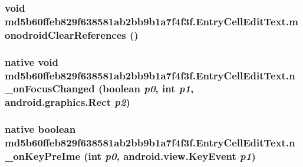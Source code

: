 \hypertarget{classmd5b60ffeb829f638581ab2bb9b1a7f4f3f_1_1_entry_cell_edit_text_3a4945fa7f86ca938cd71b78f446aa32}{
\subsubsection[{monodroidClearReferences}]{\setlength{\rightskip}{0pt plus 5cm}void md5b60ffeb829f638581ab2bb9b1a7f4f3f.EntryCellEditText.monodroidClearReferences ()}}
\label{classmd5b60ffeb829f638581ab2bb9b1a7f4f3f_1_1_entry_cell_edit_text_3a4945fa7f86ca938cd71b78f446aa32}


\hypertarget{classmd5b60ffeb829f638581ab2bb9b1a7f4f3f_1_1_entry_cell_edit_text_448e938035b755ec2d8f82eecf7787e5}{
\subsubsection[{n\_\-onFocusChanged}]{\setlength{\rightskip}{0pt plus 5cm}native void md5b60ffeb829f638581ab2bb9b1a7f4f3f.EntryCellEditText.n\_\-onFocusChanged (boolean {\em p0}, \/  int {\em p1}, \/  android.graphics.Rect {\em p2})}}
\label{classmd5b60ffeb829f638581ab2bb9b1a7f4f3f_1_1_entry_cell_edit_text_448e938035b755ec2d8f82eecf7787e5}


\hypertarget{classmd5b60ffeb829f638581ab2bb9b1a7f4f3f_1_1_entry_cell_edit_text_bbfea7c47615a8f58683006cb0629287}{
\subsubsection[{n\_\-onKeyPreIme}]{\setlength{\rightskip}{0pt plus 5cm}native boolean md5b60ffeb829f638581ab2bb9b1a7f4f3f.EntryCellEditText.n\_\-onKeyPreIme (int {\em p0}, \/  android.view.KeyEvent {\em p1})}}
\label{classmd5b60ffeb829f638581ab2bb9b1a7f4f3f_1_1_entry_cell_edit_text_bbfea7c47615a8f58683006cb0629287}


